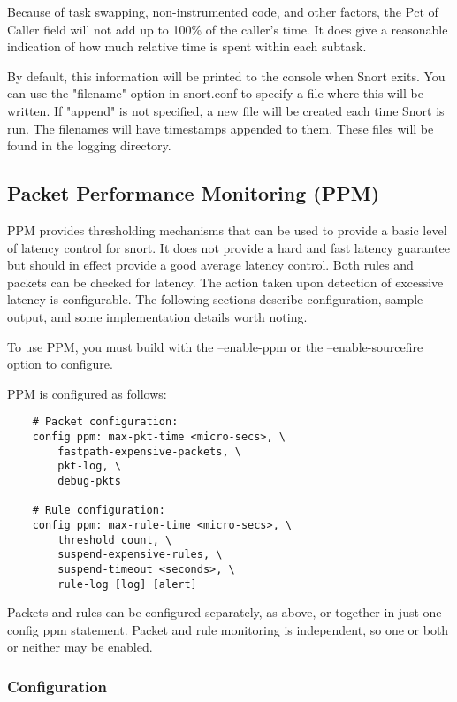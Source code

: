 \documentclass[english]{report}
\begin{document}
Because of task swapping, non-instrumented code, and other factors, the Pct of
Caller field will not add up to 100\% of the caller's time.  It does give a
reasonable indication of how much relative time is spent within each subtask.

By default, this information will be printed to the console when Snort exits.
You can use the "filename" option in snort.conf to specify a file where this
will be written. If "append" is not specified, a new file will be created each
time Snort is run. The filenames will have timestamps appended to them. These
files will be found in the logging directory.

\subsection{Packet Performance Monitoring (PPM)}
\label{ppm}
PPM provides thresholding mechanisms that can be used to provide a basic
level of latency control for snort.  It does not provide a hard and fast
latency guarantee but should in effect provide a good average latency
control.  Both rules and packets can be checked for latency.  The action
taken upon detection of excessive latency is configurable.  The following
sections describe configuration, sample output, and some implementation
details worth noting.

To use PPM, you must build with the --enable-ppm or the --enable-sourcefire
option to configure.

PPM is configured as follows:

\begin{verbatim}
    # Packet configuration:
    config ppm: max-pkt-time <micro-secs>, \
        fastpath-expensive-packets, \
        pkt-log, \
        debug-pkts
    
    # Rule configuration:
    config ppm: max-rule-time <micro-secs>, \
        threshold count, \
        suspend-expensive-rules, \
        suspend-timeout <seconds>, \
        rule-log [log] [alert]
\end{verbatim}

Packets and rules can be configured separately, as above, or together in just
one config ppm statement.  Packet and rule monitoring is independent, so one or
both or neither may be enabled.

\subsubsection{Configuration}
\end{document}
